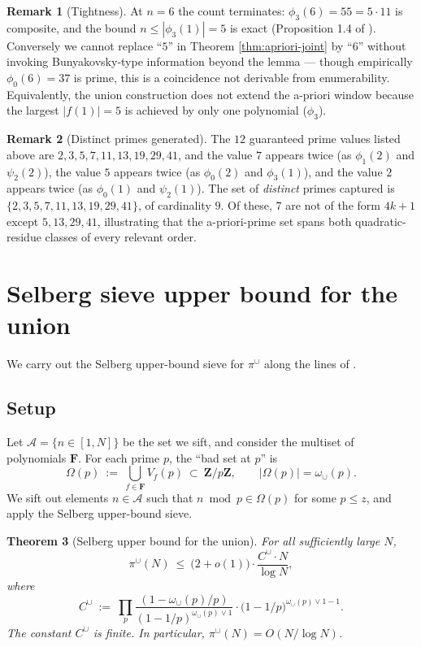 \documentclass[11pt]{article}
\newtheorem{theorem}{Theorem}[section]
\theoremstyle{definition}
\newtheorem{remark}[theorem]{Remark}
\newcommand{\Z}{\mathbf{Z}}
\newcommand{\F}{\mathbf{F}}
\newcommand{\F}{\mathcal{F}}
\begin{document}
\begin{remark}[Tightness]
At $n=6$ the count terminates: $\phi_3(6)=55=5\cdot 11$ is composite, and the bound $n\le|\phi_3(1)|=5$ is exact (Proposition 1.4 of \cite{B8}). Conversely we cannot replace ``$5$'' in Theorem \ref{thm:apriori-joint} by ``$6$'' without invoking Bunyakovsky-type information beyond the lemma --- though empirically $\phi_0(6)=37$ is prime, this is a coincidence not derivable from enumerability. Equivalently, the union construction does not extend the a-priori window because the largest $|f(1)|=5$ is achieved by only one polynomial ($\phi_3$).
\end{remark}

\begin{remark}[Distinct primes generated]
The $12$ guaranteed prime values listed above are $2,3,5,7,11,13,19,29,41$, and the value $7$ appears twice (as $\phi_1(2)$ and $\psi_2(2)$), the value $5$ appears twice (as $\phi_0(2)$ and $\phi_3(1)$), and the value $2$ appears twice (as $\phi_0(1)$ and $\psi_2(1)$). The set of \emph{distinct} primes captured is $\{2,3,5,7,11,13,19,29,41\}$, of cardinality $9$. Of these, $7$ are not of the form $4k+1$ except $5,13,29,41$, illustrating that the a-priori-prime set spans both quadratic-residue classes of every relevant order.
\end{remark}

\section{Selberg sieve upper bound for the union}\label{sec:selberg}

We carry out the Selberg upper-bound sieve for $\pi^\cup$ along the lines of \cite[Ch.\ 3]{halberstamrichert}.

\subsection{Setup}

Let $\mathcal{A}=\{n\in[1,N]\}$ be the set we sift, and consider the multiset of polynomials $\F$. For each prime $p$, the ``bad set at $p$'' is
\[
\Omega(p)\ :=\ \bigcup_{f\in\F}V_f(p)\ \subset\ \Z/p\Z,\qquad |\Omega(p)|=\omega_\cup(p).
\]
We sift out elements $n\in\mathcal{A}$ such that $n\bmod p\in\Omega(p)$ for some $p\le z$, and apply the Selberg upper-bound sieve.

\begin{theorem}[Selberg upper bound for the union]\label{thm:selberg-upper}
For all sufficiently large $N$,
\[
\pi^\cup(N)\ \le\ \bigl(2+o(1)\bigr)\cdot\frac{C^\cup\cdot N}{\log N},
\]
where
\[
C^\cup\ :=\ \prod_p \frac{(1-\omega_\cup(p)/p)}{(1-1/p)^{\omega_\cup(p)\vee 1}}\cdot\bigl(1-1/p\bigr)^{\omega_\cup(p)\vee 1 - 1}.
\]
The constant $C^\cup$ is finite. In particular, $\pi^\cup(N)=O(N/\log N)$.
\end{theorem}
\end{document}
